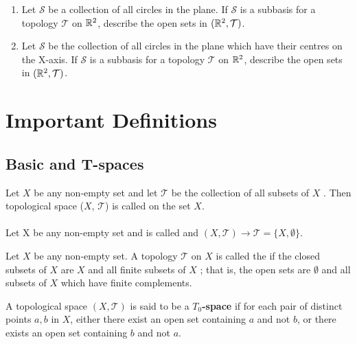 \documentclass[10pt,a4paper]{report}
\newcommand{\TT}{\mathcal{T}}
\newcommand{\SB}{\mathcal{S}}
\begin{document}
\begin{enumerate}
\item Let $\SB$ be a collection of all circles in the plane. If $\SB$ is a subbasis for a topology $\TT$ on $\mathbb{R}^2$, describe the open sets in $(\R^2, \TT)$.

\item Let $\SB$ be the collection of all circles in the plane which have their centres on the X-axis.  If $\SB$ is a subbasis for a topology $\TT$ on $\mathbb{R}^2$, describe the open sets in $(\R^2, \TT)$.

\end{enumerate} %
\setcounter{chapter}{49} 
\chapter{Important Definitions}

\section{Basic and T-spaces}

\begin{definition}Let $X$ be any non-empty set and let $\TT$ be the collection of all subsets of $X$ . Then topological space ($X$, $\TT$) is called  on the set $X$.\\
\\
Let X be any non-empty set and is called  and $(X, \TT) \to \TT = \{X, \emptyset\}$.
\end{definition}

\begin{definition}Let $X$ be any non-empty set. A topology $\TT$ on $X$ is called the  if the closed subsets
of $X$ are $X$ and all finite subsets of $X$ ; that is, the open sets are $\emptyset$ and all subsets of $X$ which have finite complements.
\end{definition}

\begin{definition}
\end{definition}

\begin{definition}[$T_0$ Spaces]A topological space $(X,\TT)$ is said to be a \textbf{$T_0$-space} if for each pair of distinct points $a,b$ in $X$, either there exist an open set containing $a$ and not $b$, or there exists an open set containing $b$ and not $a$.
\end{definition}
\end{document}
